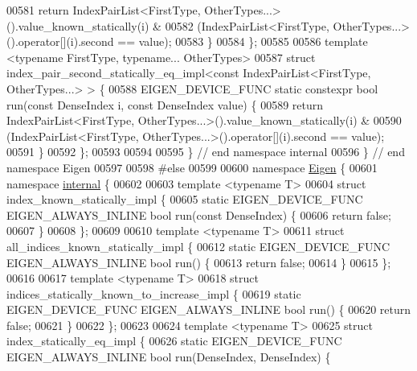 \begin{DoxyCode}
00581     \textcolor{keywordflow}{return} IndexPairList<FirstType, OtherTypes...>().value\_known\_statically(i) &
00582         (IndexPairList<FirstType, OtherTypes...>().\textcolor{keyword}{operator}[](i).second == value);
00583   \}
00584 \};
00585 
00586 \textcolor{keyword}{template} <\textcolor{keyword}{typename} FirstType, \textcolor{keyword}{typename}... OtherTypes>
00587 \textcolor{keyword}{struct }index\_pair\_second\_statically\_eq\_impl<const IndexPairList<FirstType, OtherTypes...> > \{
00588   EIGEN\_DEVICE\_FUNC \textcolor{keyword}{static} constexpr \textcolor{keywordtype}{bool} run(\textcolor{keyword}{const} DenseIndex i, \textcolor{keyword}{const} DenseIndex value) \{
00589     \textcolor{keywordflow}{return} IndexPairList<FirstType, OtherTypes...>().value\_known\_statically(i) &
00590         (IndexPairList<FirstType, OtherTypes...>().\textcolor{keyword}{operator}[](i).second == value);
00591   \}
00592 \};
00593 
00594 
00595 \}  \textcolor{comment}{// end namespace internal}
00596 \}  \textcolor{comment}{// end namespace Eigen}
00597 
00598 \textcolor{preprocessor}{#else}
00599 
00600 \textcolor{keyword}{namespace }\hyperlink{namespace_eigen}{Eigen} \{
00601 \textcolor{keyword}{namespace }\hyperlink{namespaceinternal}{internal} \{
00602 
00603 \textcolor{keyword}{template} <\textcolor{keyword}{typename} T>
00604 \textcolor{keyword}{struct }index\_known\_statically\_impl \{
00605   \textcolor{keyword}{static} EIGEN\_DEVICE\_FUNC EIGEN\_ALWAYS\_INLINE \textcolor{keywordtype}{bool} run(\textcolor{keyword}{const} DenseIndex) \{
00606     \textcolor{keywordflow}{return} \textcolor{keyword}{false};
00607   \}
00608 \};
00609 
00610 \textcolor{keyword}{template} <\textcolor{keyword}{typename} T>
00611 \textcolor{keyword}{struct }all\_indices\_known\_statically\_impl \{
00612   \textcolor{keyword}{static} EIGEN\_DEVICE\_FUNC EIGEN\_ALWAYS\_INLINE \textcolor{keywordtype}{bool} run() \{
00613     \textcolor{keywordflow}{return} \textcolor{keyword}{false};
00614   \}
00615 \};
00616 
00617 \textcolor{keyword}{template} <\textcolor{keyword}{typename} T>
00618 \textcolor{keyword}{struct }indices\_statically\_known\_to\_increase\_impl \{
00619   \textcolor{keyword}{static} EIGEN\_DEVICE\_FUNC EIGEN\_ALWAYS\_INLINE \textcolor{keywordtype}{bool} run() \{
00620     \textcolor{keywordflow}{return} \textcolor{keyword}{false};
00621   \}
00622 \};
00623 
00624 \textcolor{keyword}{template} <\textcolor{keyword}{typename} T>
00625 \textcolor{keyword}{struct }index\_statically\_eq\_impl \{
00626   \textcolor{keyword}{static} EIGEN\_DEVICE\_FUNC EIGEN\_ALWAYS\_INLINE \textcolor{keywordtype}{bool} run(DenseIndex, DenseIndex) \{

\end{DoxyCode}
